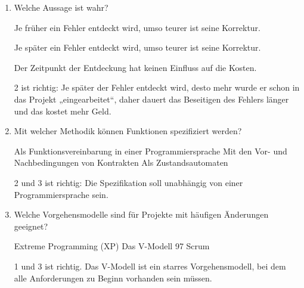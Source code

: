 \documentclass{bschlangaul-aufgabe}
\begin{document}
\begin{enumerate}


\item Welche Aussage ist wahr?

\begin{itemize}
\bCheckboxLeer Je früher ein Fehler entdeckt wird, umso teurer ist seine
Korrektur.

\bCheckboxLeer Je später ein Fehler entdeckt wird, umso teurer ist seine
Korrektur.

\bCheckboxLeer Der Zeitpunkt der Entdeckung hat keinen Einfluss auf die
Kosten.
\end{itemize}

\begin{bAntwort}
2 ist richtig: Je später der Fehler entdeckt wird, desto mehr wurde er
schon in das Projekt „eingearbeitet“, daher dauert das Beseitigen des
Fehlers länger und das kostet mehr Geld.
\end{bAntwort}


\item  Mit welcher Methodik können Funktionen spezifiziert werden?

\begin{itemize}
\bCheckboxLeer Als Funktionsvereinbarung in einer Programmiersprache
\bCheckboxLeer Mit den Vor- und Nachbedingungen von Kontrakten
\bCheckboxLeer Als Zustandsautomaten
\end{itemize}

\begin{bAntwort}
2 und 3 ist richtig: Die Spezifikation soll unabhängig von einer
Programmiersprache sein.
\end{bAntwort}


\item Welche Vorgehensmodelle sind für Projekte mit häufigen Änderungen
geeignet?

\begin{itemize}
\bCheckboxLeer Extreme Programming (XP)
\bCheckboxLeer Das V-Modell 97
\bCheckboxLeer Scrum
\end{itemize}

\begin{bAntwort}
1 und 3 ist richtig. Das V-Modell ist ein starres Vorgehensmodell, bei
dem alle Anforderungen zu Beginn vorhanden sein müssen.
\end{bAntwort}


\end{enumerate}
\end{document}
